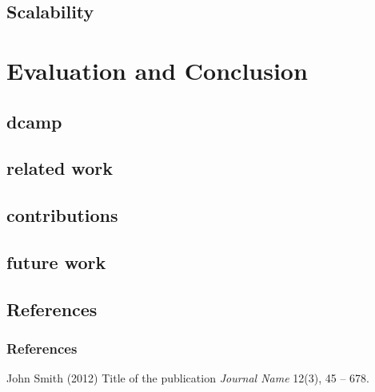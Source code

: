 \subsection{Scalability}

\section{Evaluation and Conclusion}

\subsection{dcamp}

\subsection{related work}

\subsection{contributions}

\subsection{future work}

\subsection{References}
\begin{frame}
\frametitle{References}
\footnotesize{
\begin{thebibliography}{99} %
 John Smith (2012)
\newblock Title of the publication
\newblock \emph{Journal Name} 12(3), 45 -- 678.
\end{thebibliography}
}
\end{frame}


